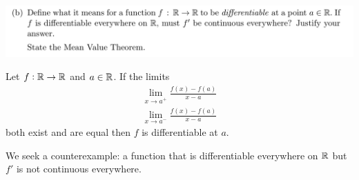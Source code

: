 \documentclass[12pt]{article}
\begin{document}
\begin{mdframed}
\includegraphics[width=400pt]{img/misc--cambridge-1a-2017-1-9D-2.png}
\end{mdframed}

\begin{definition*}
  Let $f: \mathbb{R} \to \mathbb{R}$ and $a \in \mathbb{R}$. If the limits
  \begin{align*}
    \lim_{x \to a^+} \frac{f(x) - f(a)}{x - a}\\
    \lim_{x \to a^-} \frac{f(x) - f(a)}{x - a}
  \end{align*}
  both exist and are equal then $f$ is differentiable at $a$.
\end{definition*}

We seek a counterexample: a function that is differentiable everywhere on $\mathbb{R}$ but $f'$ is not
continuous everywhere.
\end{document}
